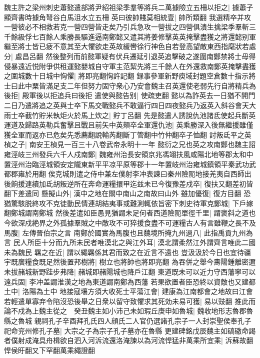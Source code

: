 魏主許之梁州刺史蕭懿遣部將尹紹祖梁季羣等將兵二萬據險立五柵以拒之|{
	據蕭子顯齊書時據角弩谷白馬沮水立五柵}
英曰彼帥賤莫相統壹|{
	帥所類翻}
我選精卒并攻一營彼必不相救若克一營四營皆走矣乃引兵急攻一營拔之四營俱潰生擒梁季羣斬三千餘級俘七百餘人乘勝長驅進逼南鄭懿又遣其將姜修擊英英掩擊盡獲之將還懿别軍繼至將士皆已疲不意其至大懼欲走英故緩轡徐行神色自若登高望敵東西指麾狀若處分|{
	處昌呂翻}
然後整列而前懿軍疑有伏兵遷延引退英追擊破之遂圍南鄭禁將士毋得侵暴遠近悦附爭供租運懿嬰城自守軍主范絜先將三千餘人在外還救南鄭英掩擊盡獲之圍城數十日城中恟懼|{
	將即亮翻恟許記翻}
録事參軍新野庾域封題空倉數十指示將士曰此中粟皆滿足支二年但努力固守衆心乃安會魏主召英還使老弱先行自將精兵為後拒|{
	殿軍後以拒追兵曰後拒}
遣使與懿告别|{
	使疏吏翻}
懿以為詐英去一日猶不開門二日乃遣將追之英與士卒下馬交戰懿兵不敢逼行四日四夜懿兵乃返英入斜谷會天大雨士卒截竹貯米執炬火於馬上炊之|{
	貯丁呂翻}
先是懿遣人誘說仇池諸氐使起兵斷英運道及歸路英勒兵奮擊且戰且前矢中英頰卒全軍還仇池|{
	英乘勝深入後無繼援雖僅獲全軍而返亦已危矣先悉薦翻說輸芮翻斷丁管翻中竹仲翻卒子恤翻}
討叛氐平之英楨之子|{
	南安王楨見一百三十八卷武帝永明十一年}
懿衍之兄也英之攻南鄭也魏主詔雍涇岐三州發兵六千人戍南鄭|{
	魏雍州治長安領京兆馮翊扶風咸陽北地等郡太和中置涇州治臨涇城領安定隴東新平平凉平原等郡十一年置岐州治雍城鎮領平秦武功武都郡雍於用翻}
俟克城則遣之侍中兼左僕射李冲表諫曰秦州險阨地接羌夷自西師出後餉援連續加氐胡叛逆所在奔命運糧擐甲迄兹未已今復豫差戍卒|{
	復扶又翻差初皆翻下差遣同}
懸擬山外|{
	漢中之地在關中南山之南故曰山外}
雖加優復|{
	復方目翻}
恐猶驚駭脱終攻不克徒動民情連胡結夷事或難測輒依旨密下刺史待軍克鄭城|{
	下戶嫁翻鄭城謂南鄭城}
然後差遣如臣愚見猶謂未足何者西道險阨單徑千里|{
	謂褒斜之道也}
今欲深戍絶界之外孤據羣賊之中敵攻不可猝援食盡不可運糧古人有言雖鞭之長不及馬腹|{
	左傳晉伯宗之言}
南鄭於國實為馬腹也且魏境所掩九州過八|{
	此指禹貢九州為言}
民人所臣十分而九所未民者唯漠北之與江外耳|{
	漠北謂柔然江外謂齊言唯此二國未為魏民}
羈之在近|{
	謂以繩羈係其君而致之在近言不遠也}
豈汲汲於今日也宜待疆宇既廣糧食既足然後置邦樹將|{
	樹立也將帥也將即亮翻}
為吞併之舉今夀陽鍾離密邇未拔赭城新野跬步弗降|{
	赭城即赭陽城也降戶江翻}
東道既未可以近力守西藩寧可以遠兵固|{
	李冲盖謂淮漢之地為東道謂南鄭為西藩}
若果欲置者臣恐終以資敵也又建都土中|{
	洛陽為土中}
地接寇壤方須大收死士平蕩江會|{
	建康為江南都會之地故曰江會}
若輕遣單寡弃令陷沒恐後舉之日衆以留守致懼求其死効未易可獲|{
	易以豉翻}
推此而論不戍為上魏主從之　癸丑魏主如小沛己未如瑕丘庚申如魯城|{
	魏收地形志魯郡魯縣之魯城}
親祠孔子辛酉拜孔氏四人顔氏二人官仍選諸孔宗子一人封崇聖侯奉孔子祀命兖州修孔子墓|{
	大宗之子為宗子孔子墓亦在魯縣}
更建碑銘戊辰魏主如碻磝命謁者僕射成淹具舟楫欲自泗入河泝流還洛淹諫以為河流悍猛非萬乘所宜乘|{
	泝蘇故翻悍侯盱翻又下罕翻萬乘繩證翻}
